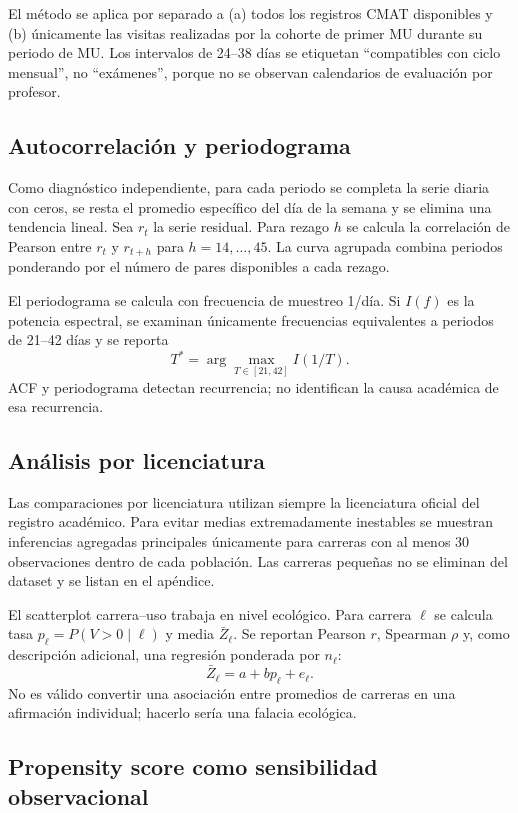 \documentclass[11pt,letterpaper]{article}
\begin{document}
El método se aplica por separado a (a) todos los registros CMAT disponibles y (b) únicamente las visitas realizadas por la cohorte de primer MU durante su periodo de MU. Los intervalos de 24--38 días se etiquetan ``compatibles con ciclo mensual'', no ``exámenes'', porque no se observan calendarios de evaluación por profesor.

\subsection{Autocorrelación y periodograma}

Como diagnóstico independiente, para cada periodo se completa la serie diaria con ceros, se resta el promedio específico del día de la semana y se elimina una tendencia lineal. Sea $r_t$ la serie residual. Para rezago $h$ se calcula la correlación de Pearson entre $r_t$ y $r_{t+h}$ para $h=14,\dots,45$. La curva agrupada combina periodos ponderando por el número de pares disponibles a cada rezago.

El periodograma se calcula con frecuencia de muestreo 1/día. Si $I(f)$ es la potencia espectral, se examinan únicamente frecuencias equivalentes a periodos de 21--42 días y se reporta
\[
T^*=\arg\max_{T\in[21,42]} I(1/T).
\]
ACF y periodograma detectan recurrencia; no identifican la causa académica de esa recurrencia.

\subsection{Análisis por licenciatura}

Las comparaciones por licenciatura utilizan siempre la licenciatura oficial del registro académico. Para evitar medias extremadamente inestables se muestran inferencias agregadas principales únicamente para carreras con al menos 30 observaciones dentro de cada población. Las carreras pequeñas no se eliminan del dataset y se listan en el apéndice.

El scatterplot carrera--uso trabaja en nivel ecológico. Para carrera $\ell$ se calcula tasa $p_\ell=P(V>0\mid\ell)$ y media $\bar Z_\ell$. Se reportan Pearson $r$, Spearman $\rho$ y, como descripción adicional, una regresión ponderada por $n_\ell$:
\[
\bar Z_\ell=a+b p_\ell+e_\ell.
\]
No es válido convertir una asociación entre promedios de carreras en una afirmación individual; hacerlo sería una falacia ecológica.

\subsection{Propensity score como sensibilidad observacional}
\end{document}
